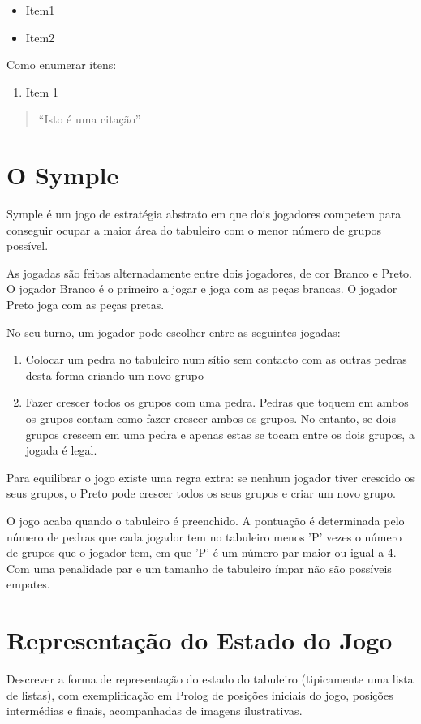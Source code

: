 \documentclass[a4paper]{article}
\begin{document}
\begin{itemize}
\item Item1
\item Item2
\end{itemize}

Como enumerar itens:

\begin{enumerate}
\item Item 1
\end{enumerate}

\begin{quote}``Isto é uma citação''\end{quote}

\section{O Symple}
Symple é um jogo de estratégia abstrato em que dois jogadores competem para conseguir ocupar a maior área do tabuleiro com o menor número de grupos possível.

As jogadas são feitas alternadamente entre dois jogadores, de cor Branco e Preto. O jogador Branco é o primeiro a jogar e joga com as peças brancas. O jogador Preto joga com as peças pretas.

No seu turno, um jogador pode escolher entre as seguintes jogadas:
\begin{enumerate}
\item Colocar um pedra no tabuleiro num sítio sem contacto com as outras pedras desta forma criando um novo grupo
\item Fazer crescer todos os grupos com uma pedra. Pedras que toquem em ambos os grupos contam como fazer crescer ambos os grupos. No entanto, se dois grupos crescem em uma pedra e apenas estas se tocam entre os dois grupos, a jogada é legal.
\end{enumerate}

Para equilibrar o jogo existe uma regra extra: se nenhum jogador tiver crescido os seus grupos, o Preto pode crescer todos os seus grupos e criar um novo grupo.

O jogo acaba quando o tabuleiro é preenchido. A pontuação é determinada pelo número de pedras que cada jogador tem no tabuleiro menos 'P' vezes o número de grupos que o jogador tem, em que 'P' é um número par maior ou igual a 4. Com uma penalidade par e um tamanho de tabuleiro ímpar não são possíveis empates.

\section{Representação do Estado do Jogo}
Descrever a forma de representação do estado do tabuleiro (tipicamente uma lista de listas), com exemplificação em Prolog de posições iniciais do jogo, posições intermédias e finais, acompanhadas de imagens ilustrativas.
\end{document}
